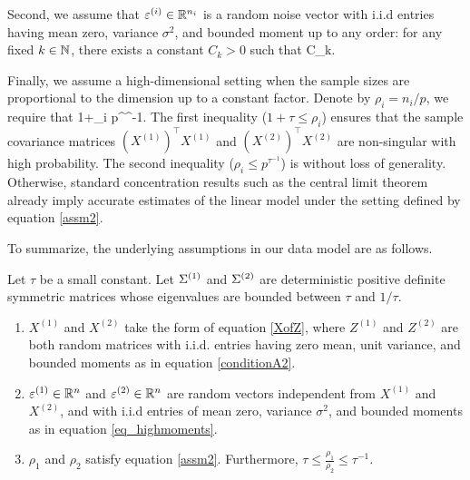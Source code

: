 Second, we assume that $\varepsilon^{(i)} \in \mathbb{R}^{n_i}$ is a random noise vector with i.i.d entries having mean zero, variance $\sigma^2$, and bounded moment up to any order: for any fixed $k\in \mathbb{N}$, there exists a constant $C_k>0$ such that
\be\label{eq_highmoments}
 \le C_k.
\ee


Finally, we assume a high-dimensional setting when the sample sizes are proportional to the dimension up to a constant factor.
Denote by $\rho_i = n_i / p$, we require that
\be\label{assm2}
1+\tau \le \rho_i \le p^{\tau^{-1}}.
\ee
The first inequality ($1 + \tau \le \rho_i$) ensures that the sample covariance matrices $(X^{(1)})^\top X^{(1)}$ and $(X^{(2)})^\top X^{(2)}$ are non-singular with high probability.
The second inequality ($\rho_i \le p^{\tau^{-1}}$) is without loss of generality.
Otherwise, standard concentration results such as the central limit theorem already imply accurate estimates of the linear model under the setting defined by equation \eqref{assm2}.

To summarize, the underlying assumptions in our data model are as follows.
\begin{assumption}\label{assm_big1}
Let $\tau$ be a small constant.
Let $\Sigma^{(1)}$ and $\Sigma^{(2)}$ are deterministic positive definite symmetric matrices whose eigenvalues are bounded between $\tau$ and $1 / \tau$.
\begin{enumerate}
\item  $X^{(1)}$ and $X^{(2)}$ take the form of equation \eqref{XofZ}, where $Z^{(1)}$ and $Z^{(2)}$ are both random matrices with i.i.d. entries having zero mean, unit variance, and bounded moments as in equation \eqref{conditionA2}.

\item $\varepsilon^{(1)} \in \mathbb{R}^{n}$ and $\varepsilon^{(2)} \in \mathbb{R}^{n}$ are random vectors independent from $X^{(1)}$ and $X^{(2)}$, and with i.i.d entries of mean zero, variance $\sigma^2$, and bounded moments as in equation \eqref{eq_highmoments}.

\item $\rho_{1}$ and $\rho_{2}$ satisfy equation \eqref{assm2}. Furthermore, $\tau \le \frac{\rho_1}{\rho_2}\le \tau^{-1}$.
\end{enumerate}
\end{assumption}


